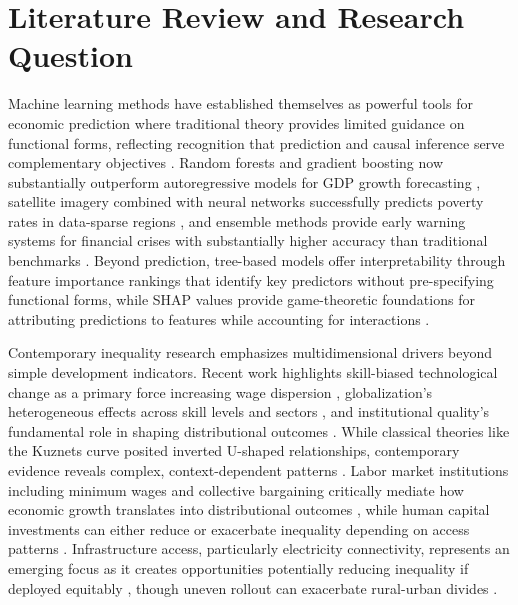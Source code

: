 \documentclass[10pt,twocolumn]{article}
\begin{document}
\section{Literature Review and Research Question}\label{sec:literature}
\par Machine learning methods have established themselves as powerful tools for economic prediction where traditional theory provides limited guidance on functional forms, reflecting recognition that prediction and causal inference serve complementary objectives \cite{mullainathan2017machine}. Random forests and gradient boosting now substantially outperform autoregressive models for GDP growth forecasting \cite{richardson2021nowcasting}, satellite imagery combined with neural networks successfully predicts poverty rates in data-sparse regions \cite{jean2016combining}, and ensemble methods provide early warning systems for financial crises with substantially higher accuracy than traditional benchmarks \cite{beutel2019machine}. Beyond prediction, tree-based models offer interpretability through feature importance rankings that identify key predictors without pre-specifying functional forms, while SHAP values provide game-theoretic foundations for attributing predictions to features while accounting for interactions \cite{lundberg2017unified}.
\par Contemporary inequality research emphasizes multidimensional drivers beyond simple development indicators. Recent work highlights skill-biased technological change as a primary force increasing wage dispersion \cite{acemoglu2002technical}, globalization's heterogeneous effects across skill levels and sectors \cite{helpman2018globalization}, and institutional quality's fundamental role in shaping distributional outcomes \cite{acemoglu2005institutions}. While classical theories like the Kuznets curve \cite{kuznets1955economic} posited inverted U-shaped relationships, contemporary evidence reveals complex, context-dependent patterns \cite{galor1993income}. Labor market institutions including minimum wages and collective bargaining critically mediate how economic growth translates into distributional outcomes \cite{freeman2009labor}, while human capital investments can either reduce or exacerbate inequality depending on access patterns \cite{lee2018human}. Infrastructure access, particularly electricity connectivity, represents an emerging focus as it creates opportunities potentially reducing inequality if deployed equitably \cite{chakravorty2014does}, though uneven rollout can exacerbate rural-urban divides \cite{zhang2024urban}.
\end{document}
